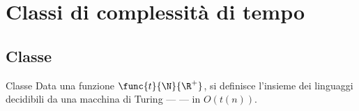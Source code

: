 \documentclass[a4paper, 12pt]{report}
\begin{document}
    \section{Classi di complessità di tempo}

    \subsection{Classe \DTIME}

    \begin{frameddefn}{Classe \DTIME}
        Data una funzione $\func{t}{\N}{\R^+}$, si definisce  l'insieme dei linguaggi decidibili da una macchina di Turing ---  --- in $O(t(n))$.
    \end{frameddefn}
\end{document}
